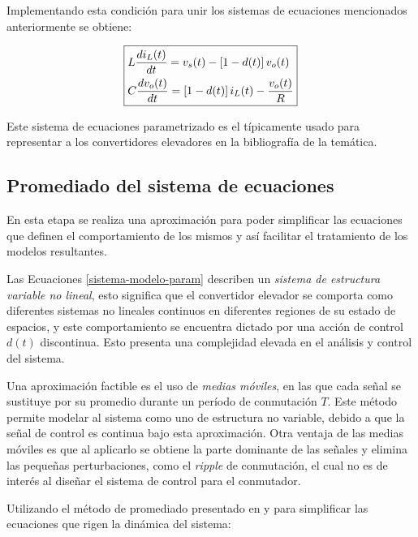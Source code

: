 Implementando esta condición para unir los sistemas de ecuaciones mencionados anteriormente se obtiene:

\begin{equation}
  \boxed{
    \begin{split}
      & L \frac{di_L(t)}{dt} = v_s(t) - \left[1-d(t)\right]v_o(t) \vspace{0.5cm}
      \\
      & C \frac{dv_o(t)}{dt} = \left[1-d(t)\right] i_L(t)- \frac{v_o(t)}{R}
  \end{split}
    }
  \label{sistema-modelo-param}
  \end{equation}

Este sistema de ecuaciones parametrizado es el típicamente usado para representar a los convertidores elevadores en la bibliografía de la temática.

\subsection{Promediado del sistema de ecuaciones}

En esta etapa se realiza una aproximación para poder simplificar las ecuaciones que definen el comportamiento de los mismos y así facilitar el tratamiento de los modelos resultantes.

Las Ecuaciones \ref{sistema-modelo-param} describen un \emph{sistema de estructura variable no lineal}, esto significa que el convertidor elevador se comporta como diferentes sistemas no lineales continuos en diferentes regiones de su estado de espacios, y este comportamiento se encuentra dictado por una acción de control $d(t)$ discontinua. Esto presenta una complejidad elevada en el análisis y control del sistema.

Una aproximación factible es el uso de \emph{medias móviles}, en las que cada señal se sustituye por su promedio durante un período de conmutación $T$. Este método permite modelar al sistema como uno de estructura no variable, debido a que la señal de control es continua bajo esta aproximación. Otra ventaja de las medias móviles es que al aplicarlo se obtiene la parte dominante de las señales y elimina las pequeñas perturbaciones, como el \emph{ripple} de conmutación, el cual no es de interés al diseñar el sistema de control para el conmutador.

Utilizando el método de promediado presentado en \cite{erickson} y \cite{hart} para simplificar las ecuaciones que rigen la dinámica del sistema:

